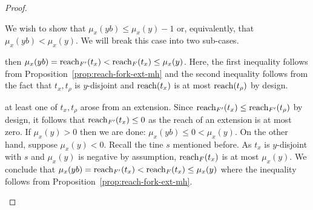 \begin{proof}
\begin{description}[font=\normalfont\itshape\space]
    \end{description}



    We wish to show that $\mu_x(yb) \leq \mu_x(y) - 1$ 
    or, equivalently, that $\mu_x(yb) < \mu_x(y)$. 
    We will break this case into two sub-cases. 
    \begin{description}[font=\normalfont\itshape\space]
      \item[If both $t_\rho, t_x \in F$,] 
      then $\mu_x(yb) = \operatorname{reach}_{F'}(t_x) < \operatorname{reach}_{F}(t_x) \leq \mu_x(y)$. 
      Here, the first inequality follows from Proposition~\ref{prop:reach-fork-ext-mh} 
      and the second inequality follows from the fact that 
      $t_x, t_\rho$ is $y$-disjoint and 
      $\operatorname{reach}(t_x)$ is at most $\operatorname{reach}(t_\rho)$ by design.

      \item[Otherwise,] 
      at least one of $t_x, t_\rho$ arose from an extension. 
      Since $\operatorname{reach}_{F'}(t_x) \leq \operatorname{reach}_{F'}(t_\rho)$ by design, 
      it follows that $\operatorname{reach}_{F'}(t_x) \leq 0$ 
      as the reach of an extension is at most zero.
      If $\mu_x(y) > 0$ then we are done: $\mu_x(yb) \leq 0 < \mu_x(y)$.  
      On the other hand, suppose $\mu_x(y) < 0$. 
      Recall the tine $s$ mentioned before.
      As $t_x$ is $y$-disjoint with $s$ and 
      $\mu_x(y)$ is negative by assumption, 
      $\operatorname{reach}_F(t_x)$ is at most $\mu_x(y)$. 
      We conclude that 
      $
      \mu_x(yb) = \operatorname{reach}_{F'}(t_x) 
      < \operatorname{reach}_F(t_x) 
      \leq \mu_x(y)
      $ 
      where the inequality follows from Proposition~\ref{prop:reach-fork-ext-mh}.




\end{description}
\end{proof}
